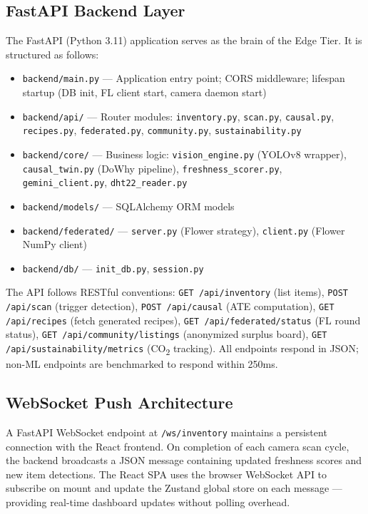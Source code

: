 \documentclass[12pt,a4paper]{report}
\begin{document}
\subsection{FastAPI Backend Layer}
The FastAPI (Python 3.11) application serves as the brain of the Edge Tier. It is structured as follows:

\begin{itemize}[leftmargin=2em, itemsep=0.1em]
    \item \texttt{backend/main.py} — Application entry point; CORS middleware; lifespan startup (DB init, FL client start, camera daemon start)
    \item \texttt{backend/api/} — Router modules: \texttt{inventory.py}, \texttt{scan.py}, \texttt{causal.py}, \texttt{recipes.py}, \texttt{federated.py}, \texttt{community.py}, \texttt{sustainability.py}
    \item \texttt{backend/core/} — Business logic: \texttt{vision\_engine.py} (YOLOv8 wrapper), \texttt{causal\_twin.py} (DoWhy pipeline), \texttt{freshness\_scorer.py}, \texttt{gemini\_client.py}, \texttt{dht22\_reader.py}
    \item \texttt{backend/models/} — SQLAlchemy ORM models
    \item \texttt{backend/federated/} — \texttt{server.py} (Flower strategy), \texttt{client.py} (Flower NumPy client)
    \item \texttt{backend/db/} — \texttt{init\_db.py}, \texttt{session.py}
\end{itemize}

The API follows RESTful conventions: \texttt{GET /api/inventory} (list items), \texttt{POST /api/scan} (trigger detection), \texttt{POST /api/causal} (ATE computation), \texttt{GET /api/recipes} (fetch generated recipes), \texttt{GET /api/federated/status} (FL round status), \texttt{GET /api/community/listings} (anonymized surplus board), \texttt{GET /api/sustainability/metrics} (CO\textsubscript{2} tracking). All endpoints respond in JSON; non-ML endpoints are benchmarked to respond within 250ms.

\subsection{WebSocket Push Architecture}
A FastAPI WebSocket endpoint at \texttt{/ws/inventory} maintains a persistent connection with the React frontend. On completion of each camera scan cycle, the backend broadcasts a JSON message containing updated freshness scores and new item detections. The React SPA uses the browser WebSocket API to subscribe on mount and update the Zustand global store on each message — providing real-time dashboard updates without polling overhead.
\end{document}
